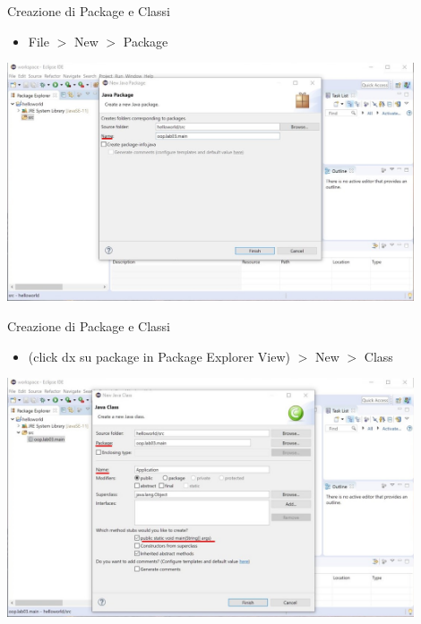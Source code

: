 \documentclass[presentation]{beamer}
\begin{document}
\begin{frame}{Creazione di Package e Classi}
\begin{itemize}
\item File $>$ New $>$ Package
\end{itemize}
\begin{center}
\includegraphics[width=0.9\textwidth]{img/eclipse-screenshots/eclipse-ide-02c.jpg}
\end{center}
\end{frame}

\begin{frame}{Creazione di Package e Classi}
\begin{itemize}
\item (click dx su package in Package Explorer View) $>$ New $>$ Class
\end{itemize}
\begin{center}
\includegraphics[width=0.9\textwidth]{img/eclipse-screenshots/eclipse-ide-02d.jpg}
\end{center}
\end{frame}
\end{document}
